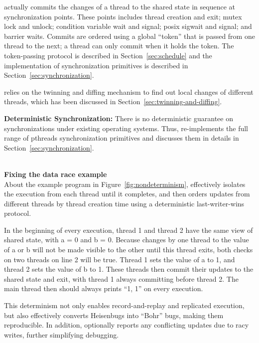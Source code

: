 \dthreads{} actually commits the changes of a thread to the shared state in sequence at synchronization points. These points includes thread creation and exit; mutex lock and unlock; condition variable wait and signal; posix sigwait and signal; and barrier waits. Commits are ordered using a global ``token'' that is passed from one thread to the next; a thread can only commit when it holds the token.  The token-passing protocol is described in Section~\ref{sec:schedule} and the implementation of synchronization primitives is described in Section~\ref{sec:synchronization}.

\dthreads{} relies on the twinning and diffing mechanism to find out local changes of different threads, which has been discussed in Section~\ref{sec:twinning-and-diffing}. 

\textbf{Deterministic Synchronization:}
There is no deterministic guarantee on synchronizations under existing operating systems. Thus, \dthreads{} re-implements the full range of pthreads synchronization primitives and discusses  them in details in Section~\ref{sec:synchronization}. 

\hspace{1em} \\
\noindent
\textbf{Fixing the data race example} \\
About the example program in Figure~\ref{fig:nondeterminism},  \dthreads{} effectively isolates the execution from each thread until it completes, and then orders updates from different threads by thread creation time using a deterministic last-writer-wins protocol.

In the beginning of every execution, thread 1 and thread 2 have the same view of shared state, with a = 0 and b = 0. Because changes by one thread to the value of a or b will not be made visible to the other until this thread exits, both checks on two threads on line 2 will be true. Thread 1 sets the value of a to 1, and thread 2 sets the value of b to 1. These threads then commit their updates to the shared state and exit, with thread 1 always committing before thread 2. The main thread then should always prints “1, 1” on every execution.

This determinism not only enables record-and-replay and replicated execution, but also effectively converts Heisenbugs into “Bohr” bugs, making them reproducible. In addition, \dthreads{} optionally reports any conflicting updates due to racy writes, further simplifying debugging.
